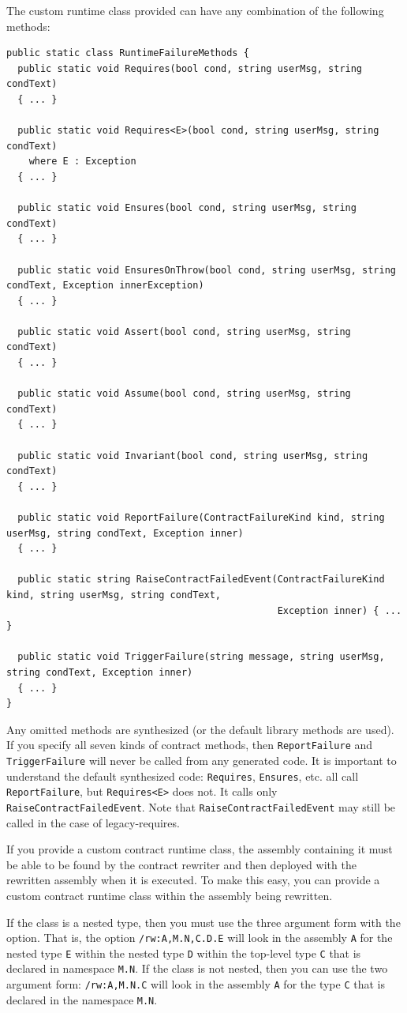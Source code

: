 \documentclass{article}
\newcommand{\code}[1]{\lstinline{#1}}
\begin{document}
The custom runtime class provided can have any combination of the
following methods:
\begin{lstlisting}
public static class RuntimeFailureMethods {
  public static void Requires(bool cond, string userMsg, string condText)
  { ... }

  public static void Requires<E>(bool cond, string userMsg, string condText)
    where E : Exception
  { ... }

  public static void Ensures(bool cond, string userMsg, string condText)
  { ... }

  public static void EnsuresOnThrow(bool cond, string userMsg, string condText, Exception innerException)
  { ... }

  public static void Assert(bool cond, string userMsg, string condText)
  { ... }

  public static void Assume(bool cond, string userMsg, string condText)
  { ... }

  public static void Invariant(bool cond, string userMsg, string condText)
  { ... }

  public static void ReportFailure(ContractFailureKind kind, string userMsg, string condText, Exception inner)
  { ... }

  public static string RaiseContractFailedEvent(ContractFailureKind kind, string userMsg, string condText, 
                                                Exception inner) { ... }

  public static void TriggerFailure(string message, string userMsg, string condText, Exception inner)
  { ... }
}
\end{lstlisting}
Any omitted methods are synthesized (or the default library methods
are used). If you specify all seven kinds of contract methods, then
\code{ReportFailure} and \code{TriggerFailure} will never be called
from any generated code. It is important to understand the default
synthesized code: \code{Requires}, \code{Ensures}, etc. all call
\code{ReportFailure}, but \code{Requires<E>} does not. It calls
only \code{RaiseContractFailedEvent}.
Note that \code{RaiseContractFailedEvent} may still be
called in the case of legacy-requires.

If you provide a custom contract runtime class, the assembly
containing it must be able to be found by the contract rewriter and
then deployed with the rewritten assembly when it is executed. To make
this easy, you can provide a custom contract runtime class within the assembly
being rewritten.

If the class is a nested type, then you must use the three argument form with the option.
That is, the option \code{/rw:A,M.N,C.D.E}
will look in the assembly \code{A} for the nested type \code{E} within the nested type
\code{D} within the top-level type \code{C} that is declared in namespace \code{M.N}.
If the class is not nested, then you can use the two argument form:
\code{/rw:A,M.N.C} will look in the assembly \code{A} for the type \code{C} that is declared in the
namespace \code{M.N}.
\end{document}

